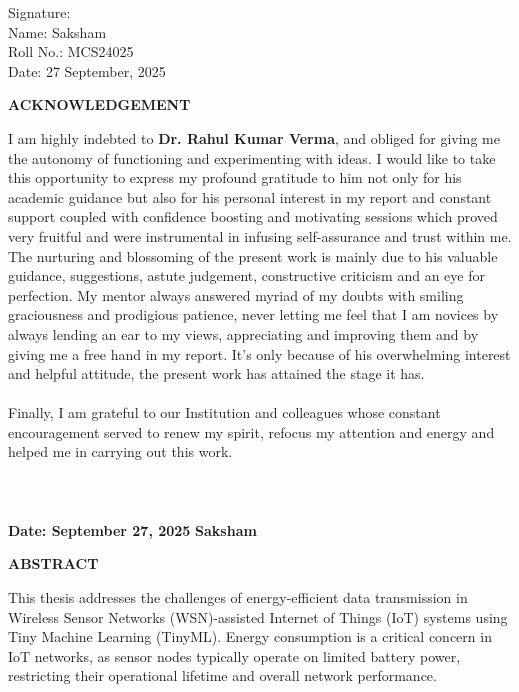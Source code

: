 \documentclass[12pt,a4paper]{article}
\begin{document}
\noindent Signature:\\
Name: Saksham\\
Roll No.: MCS24025\\
Date: 27 September, 2025\\
\clearpage
\begin{center}
{\large \bf ACKNOWLEDGEMENT}
\end{center}
I am highly indebted to {\bf Dr. Rahul Kumar Verma}, and obliged for giving me the autonomy of functioning and experimenting with ideas. I would like to take this opportunity to express my profound gratitude to him
not only for his academic guidance but also for his personal interest in my report and constant support coupled with confidence boosting and motivating sessions which proved very fruitful and were instrumental in infusing self-assurance and trust within me. The nurturing and blossoming of the present work is mainly due to his valuable guidance,
suggestions, astute judgement, constructive criticism and an eye for perfection. My mentor always answered myriad of my doubts with smiling graciousness and prodigious patience, never letting me feel that I am novices by always lending an ear to my views, appreciating and improving them and by giving me a free hand in my report. It's only because of his overwhelming interest and helpful attitude, the present work has attained the stage it has. \\
\\
Finally, I am grateful to our Institution and colleagues whose constant encouragement served to renew my spirit, refocus my attention and energy and helped me in carrying out this work.\\ \\ \\ \\
\vspace{0.7in}
\textbf{Date: September 27, 2025}
\hspace{2.8in}
\textbf{Saksham}
\clearpage
\begin{center}
{\large \bf ABSTRACT}
\end{center}

This thesis addresses the challenges of energy-efficient data transmission in Wireless Sensor Networks (WSN)-assisted Internet of Things (IoT) systems using Tiny Machine Learning (TinyML). Energy consumption is a critical concern in IoT networks, as sensor nodes typically operate on limited battery power, restricting their operational lifetime and overall network performance.
\end{document}
